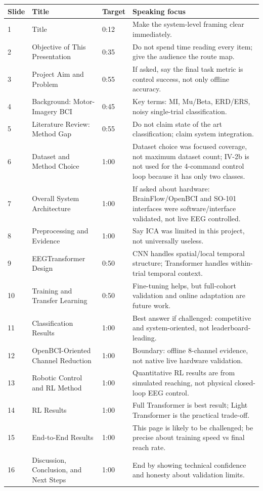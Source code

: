 \documentclass[11pt]{article}
\begin{document}
\begin{longtable}{p{12mm}p{32mm}p{18mm}p{96mm}}
\textbf{Slide} & \textbf{Title} & \textbf{Target} & \textbf{Speaking focus}\\\hline
1 & Title & 0:12 & Make the system-level framing clear immediately.\\
2 & Objective of This Presentation & 0:35 & Do not spend time reading every item; give the audience the route map.\\
3 & Project Aim and Problem & 0:55 & If asked, say the final task metric is control success, not only offline accuracy.\\
4 & Background: Motor-Imagery BCI & 0:45 & Key terms: MI, Mu/Beta, ERD/ERS, noisy single-trial classification.\\
5 & Literature Review: Method Gap & 0:55 & Do not claim state of the art classification; claim system integration.\\
6 & Dataset and Method Choice & 1:00 & Dataset choice was focused coverage, not maximum dataset count; IV-2b is not used for the 4-command control loop because it has only two classes.\\
7 & Overall System Architecture & 1:00 & If asked about hardware: BrainFlow/OpenBCI and SO-101 interfaces were software/interface validated, not live EEG controlled.\\
8 & Preprocessing and Evidence & 1:00 & Say ICA was limited in this project, not universally useless.\\
9 & EEGTransformer Design & 0:50 & CNN handles spatial/local temporal structure; Transformer handles within-trial temporal context.\\
10 & Training and Transfer Learning & 0:50 & Fine-tuning helps, but full-cohort validation and online adaptation are future work.\\
11 & Classification Results & 1:00 & Best answer if challenged: competitive and system-oriented, not leaderboard-leading.\\
12 & OpenBCI-Oriented Channel Reduction & 1:00 & Boundary: offline 8-channel evidence, not native live hardware validation.\\
13 & Robotic Control and RL Method & 1:00 & Quantitative RL results are from simulated reaching, not physical closed-loop EEG control.\\
14 & RL Results & 1:00 & Full Transformer is best result; Light Transformer is the practical trade-off.\\
15 & End-to-End Results & 1:00 & This page is likely to be challenged; be precise about training speed vs final reach rate.\\
16 & Discussion, Conclusion, and Next Steps & 1:00 & End by showing technical confidence and honesty about validation limits.\\
\end{longtable}
\newpage
\end{document}
